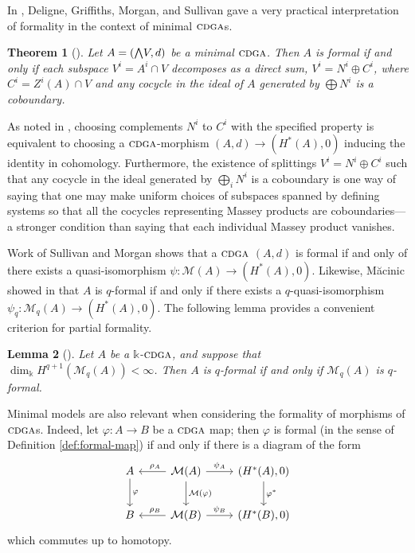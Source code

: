 \documentclass{article}
\numberwithin{equation}{section}
\newtheorem{theorem}{Theorem}[section]
\newtheorem{lemma}[theorem]{Lemma}
\theoremstyle{definition}
\renewcommand{\k}{\mathbb{k}}
\newcommand{\M}{\mathcal{M}}
\newcommand{\cdga}{\ensuremath{\textsc{cdga}}}
\newcommand{\bwedge}{\mbox{\normalsize $\bigwedge$}}
\begin{document}
In \cite{DGMS}, Deligne, Griffiths, Morgan, and Sullivan gave a very practical 
interpretation of formality in the context of minimal $\cdga$s.

\begin{theorem}[\cite{DGMS}]
\label{thm:formal-dgms}
Let $A=(\bwedge V,d)$ be a minimal $\cdga$. Then $A$  is formal 
if and only if each subspace $V^i=A^i\cap V$ decomposes as a 
direct sum, $V^i=N^i\oplus C^i$, where $C^i=Z^i(A)\cap V$
and any cocycle in the ideal of $A$ generated by $\bigoplus N^i$ is 
a coboundary.
\end{theorem}

As noted in \cite{DGMS}, choosing complements $N^i$ to $C^i$ with  
the specified property is equivalent to choosing a $\cdga$-morphism 
$(A,d)\to (H^*(A),0)$ inducing the identity in cohomology.  Furthermore, 
the existence of splittings $V^i=N^i\oplus C^i$ such that any cocycle in 
the ideal generated by $\bigoplus_i N^i$ is a coboundary is one way of 
saying that one may make uniform choices of subspaces spanned by 
defining systems so that all the cocycles representing Massey products 
are coboundaries---a stronger condition than saying that each 
individual Massey product vanishes.

Work of Sullivan \cite{Sullivan77} and Morgan \cite{Mo} shows that a 
$\cdga$ $(A,d)$ is formal if and only of there exists a quasi-isomorphism 
$\psi\colon \M(A)\to (H^{*}(A),0)$. Likewise, M\u{a}cinic showed in 
\cite{Mc10} %
that $A$ is $q$-formal if and only if there exists a 
$q$-quasi-isomorphism $\psi_q\colon \M_q(A)\to (H^{*}(A),0)$. 
The following lemma provides a convenient criterion for partial formality. 

\begin{lemma}[\cite{SW-forum}]
\label{lem:formalityeq} 
Let $A$ be a $\k$-$\cdga$, and suppose that $\dim_{\k} H^{q+1}(\M_q(A))< \infty$.  
Then $A$ is $q$-formal if and only if $\M_q(A)$ is $q$-formal.
 \end{lemma}

Minimal models are also relevant when considering the formality of 
morphisms of $\cdga$s. Indeed, let $\varphi\colon A\to B$ be a 
$\cdga$ map; then $\varphi$ is formal (in the sense of 
Definition \ref{def:formal-map}) if and only if there is a 
diagram of the form 
\begin{equation}
\label{eq:phif}
\begin{tikzcd}[column sep=24pt, row sep=22pt]
A  \ar{d}{\varphi}
&
\M(A) \ar[swap, pos=.4]{l}{\rho_A} 
\ar{d}{\M(\varphi)}
\ar{r}{\psi_A} 
& (H^{*}(A), 0) \ar{d}{\varphi^*}
\\
B 
&\M(B)\ar[swap, pos=.4]{l}{\rho_B} \ar{r}{\psi_B}
& (H^{*}(B), 0) 
\end{tikzcd}
\end{equation}
which commutes up to homotopy. 
\end{document}
